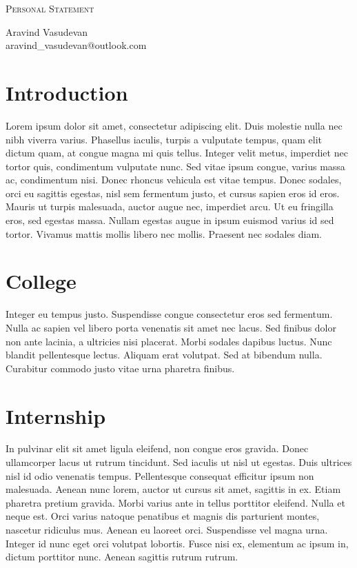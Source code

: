 \documentclass[12pt, letterpaper]{article}
\makeatletter
\renewcommand{\title}{Personal Statement}
\newcommand{\name}{Aravind Vasudevan}
\newcommand{\email}{aravind\_vasudevan@outlook.com}
\makeatother
\begin{document}
\begin{center}{\color{headingcolor} \huge \scshape \title}\end{center}
\begin{center}\vspace{0.2em} {\color{headingcolor} \Large \name\\}
  {\color{headingcolor} \email}\end{center}


\section*{Introduction}
Lorem ipsum dolor sit amet, consectetur adipiscing elit. Duis molestie nulla nec nibh viverra varius. Phasellus iaculis, turpis a vulputate tempus, quam elit dictum quam, at congue magna mi quis tellus. Integer velit metus, imperdiet nec tortor quis, condimentum vulputate nunc. Sed vitae ipsum congue, varius massa ac, condimentum nisi. Donec rhoncus vehicula est vitae tempus. Donec sodales, orci eu sagittis egestas, nisl sem fermentum justo, et cursus sapien eros id eros. Mauris ut turpis malesuada, auctor augue nec, imperdiet arcu. Ut eu fringilla eros, sed egestas massa. Nullam egestas augue in ipsum euismod varius id sed tortor. Vivamus mattis mollis libero nec mollis. Praesent nec sodales diam.

\section*{College}
Integer eu tempus justo. Suspendisse congue consectetur eros sed fermentum. Nulla ac sapien vel libero porta venenatis sit amet nec lacus. Sed finibus dolor non ante lacinia, a ultricies nisi placerat. Morbi sodales dapibus luctus. Nunc blandit pellentesque lectus. Aliquam erat volutpat. Sed at bibendum nulla. Curabitur commodo justo vitae urna pharetra finibus.

\section*{Internship}
In pulvinar elit sit amet ligula eleifend, non congue eros gravida. Donec ullamcorper lacus ut rutrum tincidunt. Sed iaculis ut nisl ut egestas. Duis ultrices nisl id odio venenatis tempus. Pellentesque consequat efficitur ipsum non malesuada. Aenean nunc lorem, auctor ut cursus sit amet, sagittis in ex. Etiam pharetra pretium gravida. Morbi varius ante in tellus porttitor eleifend. Nulla et neque est. Orci varius natoque penatibus et magnis dis parturient montes, nascetur ridiculus mus. Aenean eu laoreet orci. Suspendisse vel magna urna. Integer id nunc eget orci volutpat lobortis. Fusce nisi ex, elementum ac ipsum in, dictum porttitor nunc. Aenean sagittis rutrum rutrum.
\end{document}
